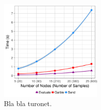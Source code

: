 % 
% 
% 
% 



\begin{figure}
  \includegraphics[width=0.45\textwidth]{plots/turonet.png}
  \caption{Bla bla turonet.}
  \label{turonet-times}
\end{figure}

